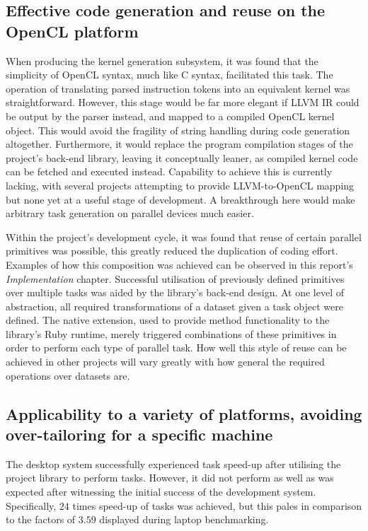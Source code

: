 \subsection{Effective code generation and reuse on the OpenCL platform}
When producing the kernel generation subsystem, it was found that the simplicity of \ac{OpenCL} syntax, much like C syntax, facilitated this task. The operation of translating parsed instruction tokens into an equivalent kernel was straightforward. However, this stage would be far more elegant if LLVM \ac{IR} could be output by the parser instead, and mapped to a compiled \ac{OpenCL} kernel object. This would avoid the fragility of string handling during code generation altogether. Furthermore, it would replace the program compilation stages of the project's back-end library, leaving it conceptually leaner, as compiled kernel code can be fetched and executed instead. Capability to achieve this is currently lacking, with several projects attempting to provide LLVM-to-\ac{OpenCL} mapping but none yet at a useful stage of development. A breakthrough here would make arbitrary task generation on parallel devices much easier.

Within the project's development cycle, it was found that reuse of certain parallel primitives was possible, this greatly reduced the duplication of coding effort. Examples of how this composition was achieved can be observed in this report's \emph{Implementation} chapter. Successful utilisation of previously defined primitives over multiple tasks was aided by the library's back-end design. At one level of abstraction, all required transformations of a dataset given a task object were defined. The native extension, used to provide method functionality to the library's Ruby runtime, merely triggered combinations of these primitives in order to perform each type of parallel task. How well this style of reuse can be achieved in other projects will vary greatly with how general the required operations over datasets are.


\subsection{Applicability to a variety of platforms, avoiding over-tailoring for a specific machine}
The desktop system successfully experienced task speed-up after utilising the project library to perform tasks. However, it did not perform as well as was expected after witnessing the initial success of the development system. Specifically, $2$\textendash$4$ times speed-up of tasks was achieved, but this pales in comparison to the factors of $3.5$\textendash$9$ displayed during laptop benchmarking.

